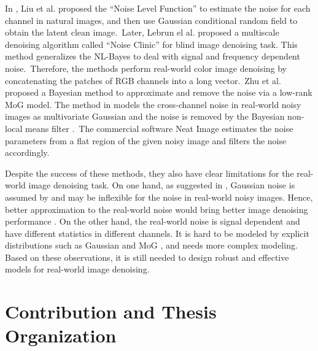 In \cite{Liu2008}, Liu et al. proposed the ``Noise Level Function'' to estimate the noise for each channel in natural images, and then use Gaussian conditional random field to obtain the latent clean image.\ Later, Lebrun el al. proposed a multiscale denoising algorithm called ``Noise Clinic'' \cite{noiseclinic} for blind image denoising task. This method generalizes the NL-Bayes \cite{nlbayes} to deal with signal and frequency dependent noise.\ Therefore, the methods \cite{noiseclinic,ncwebsite,Zhu_2016_CVPR} perform real-world color image denoising by concatenating the patches of RGB channels into a long vector.\ Zhu et al. \cite{Zhu_2016_CVPR} proposed a Bayesian method to approximate and remove the noise via a low-rank MoG model. The method in \cite{crosschannel2016} models the cross-channel noise in real-world noisy images as multivariate Gaussian and the noise is removed by the Bayesian non-local means filter \cite{kervrann2007bayesian}.\ The commercial software Neat Image \cite{neatimage} estimates the noise parameters from a flat region of the given noisy image and filters the noise accordingly. 


Despite the success of these methods, they also have clear limitations for the real-world image denoising task. On one hand, as suggested in \cite{Liu2008,noiseclinic}, Gaussian noise is assumed by \cite{fullyblind,rabie2005robust,Liu2008} and may be inflexible for the noise in real-world noisy images. Hence, better approximation to the real-world noise would bring better image denoising performance \cite{Liu2008,noiseclinic}. On the other hand, the real-world noise is signal dependent and have different statistics in different channels. It is hard to be modeled by explicit distributions such as Gaussian and MoG \cite{Liu2008,Leungtip,crosschannel2016,karaimer_brown_ECCV_2016,dnd2017}, and needs more complex modeling. Based on these observations, it is still needed to design robust and effective models for real-world image denoising.


\section{Contribution and Thesis Organization}
\label{sec:intro:new}

